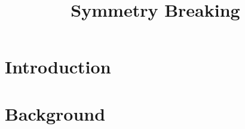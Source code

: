 

\title{Symmetry Breaking}


	\maketitle

	\listoftodos

	\begin{abstract}
	\end{abstract}

	\section{Introduction}
	\label{sec:Introduction}
		

	\section{Background} \label{sec:Background}
		

	\newpage
	
	

